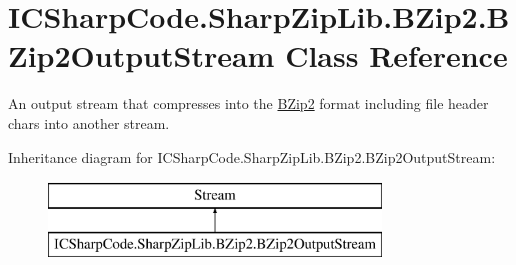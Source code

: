 \hypertarget{class_i_c_sharp_code_1_1_sharp_zip_lib_1_1_b_zip2_1_1_b_zip2_output_stream}{}\section{I\+C\+Sharp\+Code.\+Sharp\+Zip\+Lib.\+B\+Zip2.\+B\+Zip2\+Output\+Stream Class Reference}
\label{class_i_c_sharp_code_1_1_sharp_zip_lib_1_1_b_zip2_1_1_b_zip2_output_stream}


An output stream that compresses into the \hyperlink{namespace_i_c_sharp_code_1_1_sharp_zip_lib_1_1_b_zip2}{B\+Zip2} format including file header chars into another stream.  


Inheritance diagram for I\+C\+Sharp\+Code.\+Sharp\+Zip\+Lib.\+B\+Zip2.\+B\+Zip2\+Output\+Stream\+:\begin{figure}[H]
\begin{center}
\leavevmode
\includegraphics[height=2.000000cm]{class_i_c_sharp_code_1_1_sharp_zip_lib_1_1_b_zip2_1_1_b_zip2_output_stream}
\end{center}
\end{figure}
